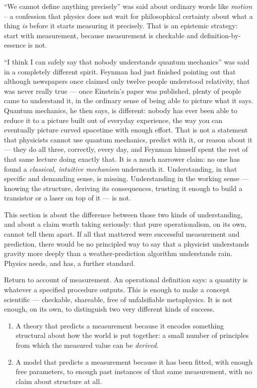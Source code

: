 ``We cannot define anything precisely'' was said about ordinary words like
\emph{motion} -- a confession that physics does not wait for philosophical
certainty about what a thing \emph{is} before it starts measuring it precisely.
That is an epistemic strategy: start with measurement, because measurement is
checkable and definition-by-essence is not.

``I think I can safely say that nobody understands quantum mechanics'' was said
in a completely different spirit.  Feynman had just finished pointing out that
although newspapers once claimed only twelve people understood relativity, that
was never really true --- once Einstein's paper was published, plenty of people
came to understand it, in the ordinary sense of being able to picture what it
says. Quantum mechanics, he then says, is different: nobody has ever been able
to reduce it to a picture built out of everyday experience, the way you can
eventually picture curved spacetime with enough effort. That is not a statement
that physicists cannot use quantum mechanics, predict with it, or reason about
it --- they do all three, correctly, every day, and Feynman himself spent the
rest of that same lecture doing exactly that. It is a much narrower claim: no
one has found a \emph{classical, intuitive mechanism} underneath it.
Understanding, in that specific and demanding sense, is missing. Understanding
in the working sense --- knowing the structure, deriving its consequences,
trusting it enough to build a transistor or a laser on top of it --- is not.

This section is about the difference between those two kinds of understanding,
and about a claim worth taking seriously: that pure operationalism, on its own,
cannot tell them apart. If all that mattered were successful measurement and
prediction, there would be no principled way to say that a physicist
understands gravity more deeply than a weather-prediction algorithm understands
rain. Physics needs, and has, a further standard.

Return to  account of measurement. An operational definition says: a quantity
is whatever a specified procedure outputs. This is enough to make a concept
scientific --- checkable, shareable, free of unfalsifiable metaphysics. It is
not enough, on its own, to distinguish two very different kinds of success.
\begin{enumerate}
\item A theory that predicts a measurement because it encodes something
    structural about how the world is put together: a small number of
        principles from which the measured value can be \emph{derived}.
\item A model that predicts a measurement because it has been fitted, with
    enough free parameters, to enough past instances of that same measurement,
        with no claim about structure at all.
\end{enumerate}

